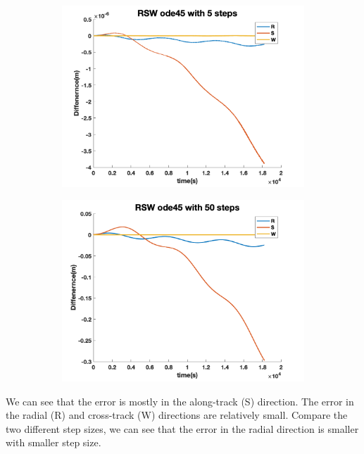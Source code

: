 \documentclass[12pt
,headinclude
,headsepline
,bibtotocnumbered
]{scrartcl}
\begin{document}
\begin{figure}[H]
\begin{subfigure}[b]{0.45\textwidth}
    \includegraphics[width=1\textwidth]{./plots/ode45_5_yprime_RSW.png}
    \end{subfigure}
    \begin{subfigure}[b]{0.45\textwidth}
    \includegraphics[width=1\textwidth]{./plots/ode45_50_yprime_RSW.png}
    \end{subfigure}
    \end{figure}
    We can see that the error is mostly in the along-track (S) direction. The error in the radial (R) and cross-track (W) directions are relatively small. Compare the two different step sizes, we can see that the error in the radial direction is smaller with smaller step size. 
\end{document}
